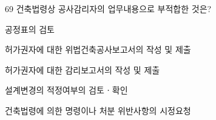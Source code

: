 \begin{question}{69}
건축법령상 공사감리자의 업무내용으로 부적합한 것은?
\begin{choices}
  \item 공정표의 검토
  \item 허가권자에 대한 위법건축공사보고서의 작성 및 제출
  \item 허가권자에 대한 감리보고서의 작성 및 제출
  \item 설계변경의 적정여부의 검토ㆍ확인
  \item 건축법령에 의한 명령이나 처분 위반사항의 시정요청
\end{choices}
\end{question}
